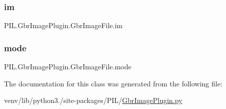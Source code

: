 \subsubsection{\texorpdfstring{im}{im}}
{\footnotesize\ttfamily P\+I\+L.\+Gbr\+Image\+Plugin.\+Gbr\+Image\+File.\+im}

\mbox{\label{classPIL_1_1GbrImagePlugin_1_1GbrImageFile_ac8a881bc1d821b1f94b6cbac9ac53436}} 
\subsubsection{\texorpdfstring{mode}{mode}}
{\footnotesize\ttfamily P\+I\+L.\+Gbr\+Image\+Plugin.\+Gbr\+Image\+File.\+mode}



The documentation for this class was generated from the following file\+:\begin{DoxyCompactItemize}
\item 
venv/lib/python3./site-\/packages/\+P\+I\+L/\hyperlink{GbrImagePlugin_8py}{Gbr\+Image\+Plugin.\+py}\end{DoxyCompactItemize}
